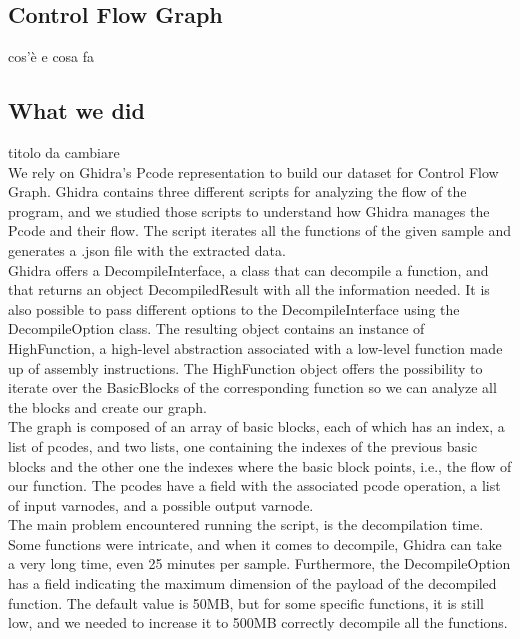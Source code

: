 \subsection{Control Flow Graph}
cos'è e cosa fa

\subsection{What we did}
titolo da cambiare\\

We rely on Ghidra's Pcode representation to build our dataset for Control Flow Graph. Ghidra contains three different scripts for analyzing the flow of the program, and we studied those scripts to understand how Ghidra manages the Pcode and their flow. The script iterates all the functions of the given sample and generates a .json file with the extracted data.\\

Ghidra offers a DecompileInterface, a class that can decompile a function, and that returns an object DecompiledResult with all the information needed. It is also possible to pass different options to the DecompileInterface using the DecompileOption class. The resulting object contains an instance of HighFunction, a high-level abstraction associated with a low-level function made up of assembly instructions. The HighFunction object offers the possibility to iterate over the BasicBlocks of the corresponding function so we can analyze all the blocks and create our graph.\\

The graph is composed of an array of basic blocks, each of which has an index, a list of pcodes, and two lists, one containing the indexes of the previous basic blocks and the other one the indexes where the basic block points, i.e., the flow of our function. The pcodes have a field with the associated pcode operation, a list of input varnodes, and a possible output varnode. \\

The main problem encountered running the script, is the decompilation time. Some functions were intricate, and when it comes to decompile, Ghidra can take a very long time, even 25 minutes per sample.  Furthermore, the DecompileOption has a field indicating the maximum dimension of the payload of the decompiled function. The default value is 50MB, but for some specific functions, it is still low, and we needed to increase it to 500MB correctly decompile all the functions.  \\

